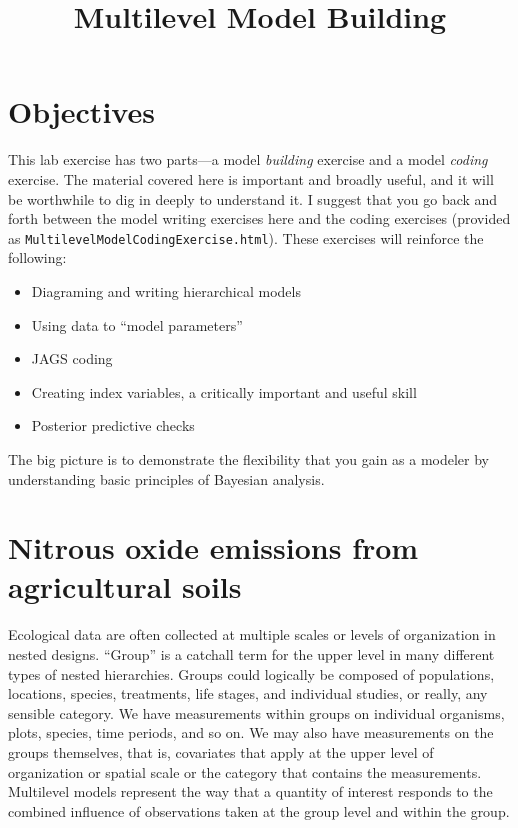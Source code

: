 \documentclass[12pt, oneside]{article}
\title{\vspace{-1cm}Multilevel Model Building}
\begin{document}
\maketitle

\thispagestyle{fancy}

\section*{Objectives}
This lab exercise has two parts---a model \emph{building} exercise and a model \emph{coding} exercise.  The material covered here is important and broadly useful, and it will be worthwhile to dig in deeply to understand it.  I suggest that you go back and forth between the model writing exercises here and the coding exercises (provided as \texttt{MultilevelModelCodingExercise.html}). These exercises will reinforce the following:

\begin{itemize}
\item Diagraming and writing hierarchical models
\item Using data to ``model parameters''
\item JAGS coding
\item Creating index variables, a critically important and useful skill
\item Posterior predictive checks
\end{itemize}
The big picture is to demonstrate the flexibility that you gain as a modeler by understanding basic principles of Bayesian analysis. 
\newpage

\section*{Nitrous oxide emissions from agricultural soils}

Ecological data are often collected at multiple scales or levels of organization in nested designs. ``Group'' is a catchall term for the upper level in many different types of nested hierarchies. Groups could logically be composed of populations, locations, species, treatments, life stages, and individual studies, or really, any sensible category. We have measurements within groups on individual organisms, plots, species, time periods, and so on. We may also have measurements on the groups themselves, that is, covariates that apply at the upper level of organization or spatial scale or the category that contains the measurements. Multilevel models represent the way that a quantity of interest responds to the combined influence of observations taken at the group level and within the group. 
\end{document}
